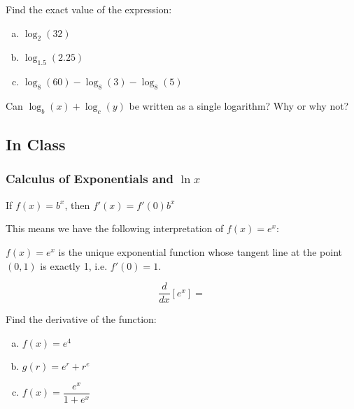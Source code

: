 \documentclass[notes]{subfiles}
\begin{document}
		\begin{ex}
			Find the exact value of the expression:
			\begin{enumerate}[(a)]	
				\item \(\log_2 (32)\)
					
				\item \(\log_{1.5} (2.25)\)
					
				\item \(\log_8(60)-\log_8(3) - \log_8(5)\)
			\end{enumerate}
		\end{ex}
		
		\begin{ex}
			Can \(\log_b(x) + \log_c(y)\) be written as a single logarithm? Why or why not?
		\end{ex}
			\vs{1}
			\newpage
			
	\subsection*{In Class}
	\subsubsection*{Calculus of Exponentials and \(\ln x\)}	
		\begin{rmk}
			If \(f(x) = b^x\), then \(f'(x) = f'(0)b^x\)
		\end{rmk}
		\begin{pf}
			\vs{2}
		\end{pf}
		
		This means we have the following interpretation of \(f(x) = e^x\):
		\begin{rmk}
			\(f(x) = e^x\) is the unique exponential function whose tangent line at the point \((0,1)\) is exactly 1, i.e. \(f'(0) = 1\).
		\end{rmk}
		
		\begin{rmk}[Derivative of \(e^x\)]
			\[\dfrac{d}{dx}\left[e^x\right] = \]
		\end{rmk}
			\newpage
			
		\begin{ex}
			Find the derivative of the function:
			\begin{enumerate}[(a)]
				\item \(f(x) = e^4\)
					\vs{1}
					
				\item \(g(r) = e^r + r^e\)
					\vs{1}
					
				\item \(f(x) = \dfrac{e^x}{1+e^x}\)
					\vs{1}
			\end{enumerate}
		\end{ex}
		
\end{document}
